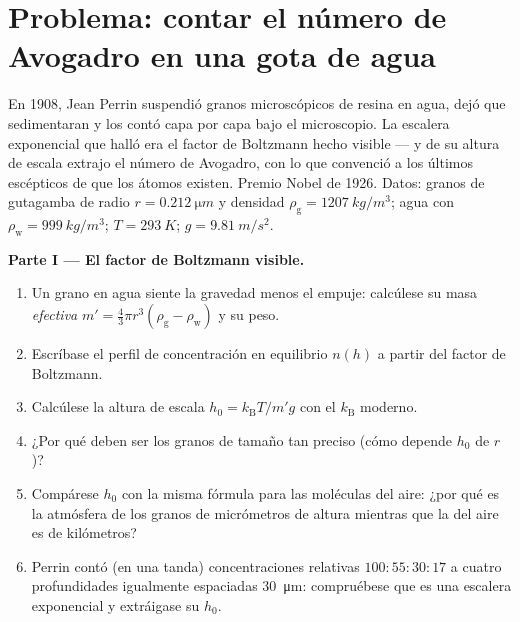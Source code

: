 \section{Problema: contar el número de Avogadro en una gota de agua}

\begin{problem}\label{pb:b3:canonical-ensemble:1}
En 1908, Jean Perrin suspendió granos microscópicos de resina en agua,
dejó que sedimentaran y los contó capa por capa bajo el
microscopio. La escalera exponencial que halló era el factor de Boltzmann
hecho visible --- y de su altura de escala extrajo el
número de Avogadro, con lo que convenció a los últimos escépticos de que los
átomos existen. Premio Nobel de 1926. Datos: granos de gutagamba de radio $r =
\qty{0.212}{\micro m}$ y densidad $\rho_{\text{g}} =
\qty{1207}{kg/m^3}$; agua con $\rho_{\text{w}} = \qty{999}{kg/m^3}$;
$T = \qty{293}{K}$; $g = \qty{9.81}{m/s^2}$.

\medskip\noindent\textbf{Parte I --- El factor de Boltzmann visible.}
\begin{enumerate}
  \item Un grano en agua siente la gravedad menos el empuje: calcúlese su
        masa \emph{efectiva} $m' = \tfrac43\pi r^3(\rho_{\text{g}}
        - \rho_{\text{w}})$ y su peso.
  \item Escríbase el perfil de concentración en equilibrio $n(h)$ a partir
        del factor de Boltzmann.
  \item Calcúlese la altura de escala $h_0 = k_{\text{B}}T/m'g$ con
        el $k_{\text{B}}$ moderno.
  \item ¿Por qué deben ser los granos de tamaño tan preciso (cómo depende
        $h_0$ de $r$)?
  \item Compárese $h_0$ con la misma fórmula para las moléculas del aire:
        ¿por qué es la atmósfera de los granos de micrómetros de altura
        mientras que la del aire es de kilómetros?
  \item Perrin contó (en una tanda) concentraciones relativas
        $100 : 55 : 30 : 17$ a cuatro profundidades igualmente espaciadas
        \qty{30}{\micro m}: compruébese que es una escalera
        exponencial y extráigase su $h_0$.
\end{enumerate}


\end{problem}
